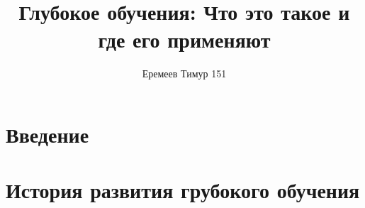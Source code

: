 \documentclass[a4paper, 12pt]{article}
\begin{document}
    \title{Глубокое обучения: Что это такое и где его применяют}
    \author{Еремеев Тимур 151}
    \date{}

    \maketitle

    \tableofcontents

    \section*{Введение}    
    

    \section*{История развития грубокого обучения}
    
\end{document}
